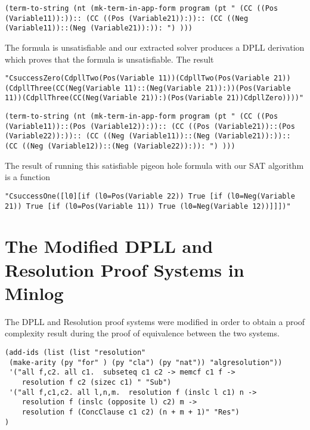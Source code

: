 \begin{center}
\texttt{(term-to-string (nt (mk-term-in-app-form program (pt "                                                                                                 (CC ((Pos (Variable11)):))::                                                    
(CC ((Pos (Variable21)):))::                                                    
(CC ((Neg (Variable11))::(Neg (Variable21)):)):                                                                                                                 
") )))}
\end{center}

The formula is unsatisfiable and our extracted solver produces a DPLL derivation which proves that the formula is unsatisfiable. The result 
\begin{center}
\texttt{"CsuccessZero(CdpllTwo(Pos(Variable 11))(CdpllTwo(Pos(Variable 21))(CdpllThree(CC(Neg(Variable 11)::(Neg(Variable 21)):))(Pos(Variable 11))(CdpllThree(CC(Neg(Variable 21)):)(Pos(Variable 21))CdpllZero))))"}
\end{center}

\begin{center}
\texttt{(term-to-string (nt (mk-term-in-app-form program (pt "                          
(CC ((Pos (Variable11))::(Pos (Variable12)):))::                                
(CC ((Pos (Variable21))::(Pos (Variable22)):))::                                
(CC ((Neg (Variable11))::(Neg (Variable21)):))::                                
(CC ((Neg (Variable12))::(Neg (Variable22)):)):                                 
") )))}
\end{center}

The result of running this satisfiable pigeon hole formula with our SAT algorithm is a function 

\begin{center}
\texttt{"CsuccessOne([l0][if (l0=Pos(Variable 22)) True [if (l0=Neg(Variable 21)) True [if (l0=Pos(Variable 11)) True (l0=Neg(Variable 12))]]])"}
\end{center}

\section{The Modified DPLL and  Resolution Proof Systems in Minlog}
The DPLL and Resolution proof systems were modified in order to obtain a proof complexity result during the proof of equivalence between the two systems.


\begin{lstlisting}
(add-ids (list (list "resolution" 
 (make-arity (py "for" ) (py "cla") (py "nat")) "algresolution"))
 '("all f,c2. all c1.  subseteq c1 c2 -> memcf c1 f -> 
    resolution f c2 (sizec c1) " "Sub")
 '("all f,c1,c2. all l,n,m.  resolution f (inslc l c1) n -> 
    resolution f (inslc (opposite l) c2) m -> 
    resolution f (ConcClause c1 c2) (n + m + 1)" "Res")
)
\end{lstlisting}

